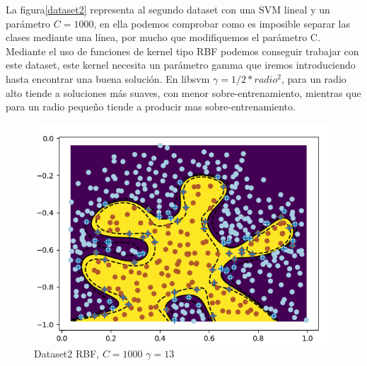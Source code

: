 La figura\ref{dataset2} representa al segundo dataset con una SVM lineal y un parámetro $C=1000$, en ella podemos comprobar como es imposible separar las clases mediante una línea, por mucho que modifiquemos el parámetro C. \\
Mediante el uso de funciones de kernel tipo RBF podemos conseguir trabajar con este dataset, este kernel necesita un parámetro gamma que iremos introduciendo hasta encontrar una buena solución. En libsvm $\gamma = 1/2*radio^2$, para un radio alto tiende a soluciones más suaves, con menor sobre-entrenamiento, mientras que para un radio pequeño tiende a producir mas sobre-entrenamiento.

\begin{figure}[H]
	\centering
	\includegraphics[scale=1]{img/dataset2_2}
    \caption{Dataset2 RBF, $C=1000$ $\gamma=13$}
    \label{dataset2_2}
\end{figure}

